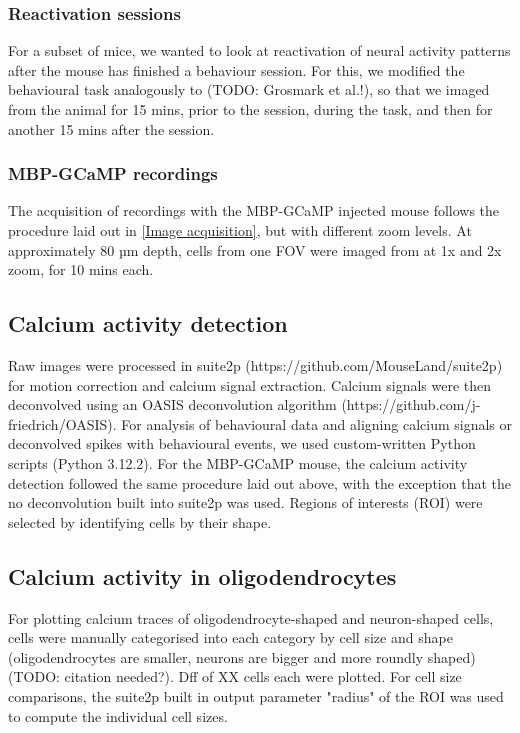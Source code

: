 \subsubsection{Reactivation sessions}
For a subset of mice, we wanted to look at reactivation of neural activity patterns after the mouse has finished a behaviour session.
For this, we modified the behavioural task analogously to (TODO: Grosmark et al.!), so that we imaged from the animal for 15 mins, prior to the session, during the task, and then for another 15 mins after the session.
\subsubsection{MBP-GCaMP recordings}
The acquisition of recordings with the MBP-GCaMP injected mouse follows the procedure laid out in \ref{Image acquisition}, but with different zoom levels.
At approximately 80 µm depth, cells from one FOV were imaged from at 1x and 2x zoom, for 10 mins each.
\subsection{Calcium activity detection}
Raw images were processed in suite2p (https://github.com/MouseLand/suite2p) for motion correction and calcium signal extraction. Calcium signals were then deconvolved using an OASIS deconvolution algorithm (https://github.com/j-friedrich/OASIS).
For analysis of behavioural data and aligning calcium signals or deconvolved spikes with behavioural events, we used custom-written Python scripts (Python 3.12.2).
For the MBP-GCaMP mouse, the calcium activity detection followed the same procedure laid out above, with the exception that the no deconvolution built into suite2p was used. Regions of interests (ROI) were selected by identifying cells by their shape.
\subsection{Calcium activity in oligodendrocytes}
For plotting calcium traces of oligodendrocyte-shaped and neuron-shaped cells, cells were manually categorised into each category by cell size and shape (oligodendrocytes are smaller, neurons are bigger and more roundly shaped) (TODO: citation needed?). Dff of XX cells each were plotted.
For cell size comparisons, the suite2p built in output parameter "radius" of the ROI was used to compute the individual cell sizes. 
